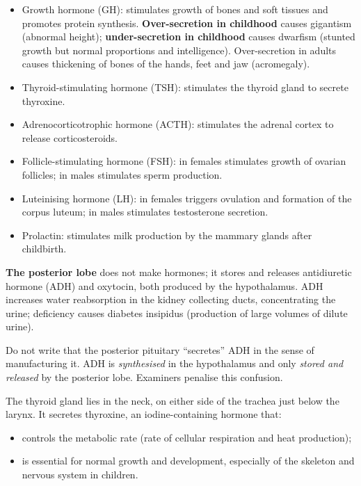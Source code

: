 \documentclass[11pt]{article}
\newcommand{\cle}[1]{{\popxbold\color{popdark}#1}}
\newcounter{popsec}
\newcounter{popsub}
\newcommand{\courssub}[1]{%
  \stepcounter{popsub}%
  \par\vspace{9pt}\noindent{\popxbold\fontsize{11.5}{13}\selectfont\color{popink}{\color{poporange}\thepopsec.\thepopsub}\hspace{6pt}#1}\par\nopagebreak\vspace{4pt}
}
\begin{document}
\begin{itemize}
\item \cle{Growth hormone (GH)}: stimulates growth of bones and soft tissues and promotes protein synthesis. \textbf{Over-secretion in childhood} causes \cle{gigantism} (abnormal height); \textbf{under-secretion in childhood} causes \cle{dwarfism} (stunted growth but normal proportions and intelligence). Over-secretion in adults causes thickening of bones of the hands, feet and jaw (\cle{acromegaly}).
\item \cle{Thyroid-stimulating hormone (TSH)}: stimulates the thyroid gland to secrete thyroxine.
\item \cle{Adrenocorticotrophic hormone (ACTH)}: stimulates the adrenal cortex to release corticosteroids.
\item \cle{Follicle-stimulating hormone (FSH)}: in females stimulates growth of ovarian follicles; in males stimulates sperm production.
\item \cle{Luteinising hormone (LH)}: in females triggers ovulation and formation of the corpus luteum; in males stimulates testosterone secretion.
\item \cle{Prolactin}: stimulates milk production by the mammary glands after childbirth.
\end{itemize}

\textbf{The posterior lobe} does not make hormones; it stores and releases \cle{antidiuretic hormone (ADH)} and oxytocin, both produced by the hypothalamus. ADH increases water reabsorption in the kidney collecting ducts, concentrating the urine; deficiency causes \cle{diabetes insipidus} (production of large volumes of dilute urine).

\begin{attention}
Do not write that the posterior pituitary ``secretes'' ADH in the sense of manufacturing it. ADH is \emph{synthesised} in the hypothalamus and only \emph{stored and released} by the posterior lobe. Examiners penalise this confusion.
\end{attention}

\courssub{The Thyroid Gland}

The \cle{thyroid gland} lies in the neck, on either side of the trachea just below the larynx. It secretes \cle{thyroxine}, an iodine-containing hormone that:

\begin{itemize}
\item controls the \cle{metabolic rate} (rate of cellular respiration and heat production);
\item is essential for normal \cle{growth and development}, especially of the skeleton and nervous system in children.
\end{itemize}
\end{document}
